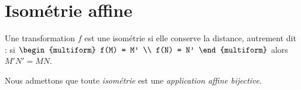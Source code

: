 \providecommand{\Id}{\mathrm{Id}}
\providecommand{\Droite}{(\mathscr{D})}
\providecommand{\DroiteU}{(\mathscr{D}_1)}
\providecommand{\DroiteD}{(\mathscr{D}_2)}
\providecommand{\Arg}[1]{\mathrm{Arg}\left(#1\right)}

\section{Isom\'etrie affine}
      \begin{defi}
            Une transformation $f$ est une isom\'etrie si elle conserve la distance, autrement dit :
            si 
            $ \begin{multiform}
                  f(M) = M' \\
                  f(N) = N'
            \end{multiform}      
            $
            alors 
            $M'N' = MN$.
            
            Nous admettons que toute \emph{isom\'etrie} est une \emph{application affine bijective}.
      \end{defi}
